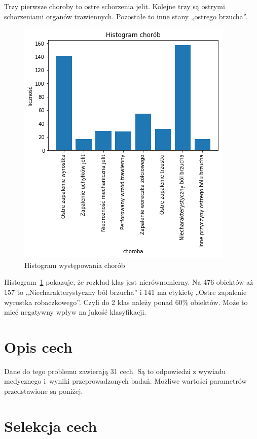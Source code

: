     Trzy pierwsze choroby to ostre schorzenia jelit.
    Kolejne trzy są ostrymi schorzeniami organów trawiennych.
    Pozostałe to inne stany „ostrego brzucha”.

    \begin{figure}[htp]
        \centering
        \includegraphics[scale=0.7]{./img/histogram.png}
        \caption{Histogram występowania chorób}
        \label{hist}
    \end{figure}

    Histogram~\ref{hist} pokazuje, że rozkład klas jest nierównomierny.
    Na 476 obiektów aż 157 to „Niecharakterystyczny ból brzucha” i 141 ma etykietę „Ostre zapalenie wyrostka robaczkowego”.
    Czyli do 2 klas należy ponad 60\% obiektów.
    Może to mieć negatywny wpływ na jakość klasyfikacji.

    \section{Opis cech}\label{sec:opisCech}

    Dane do tego problemu zawierają 31 cech.
    Są to odpowiedzi z wywiadu medycznego i~wyniki przeprowadzonych badań.
    Możliwe wartości parametrów przedstawione są poniżej.

    

    \section{Selekcja cech}\label{sec:selekcjaCech}

